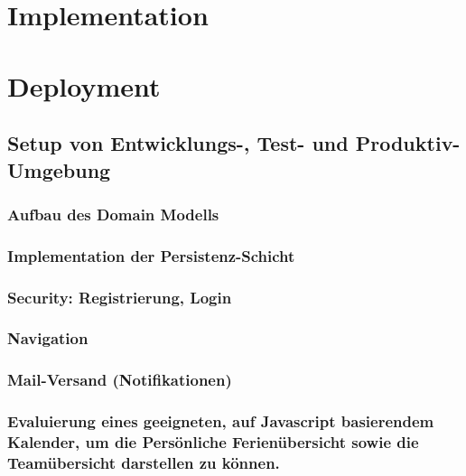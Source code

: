\chapter{Implementation}\label{implementation}\label{implementation}

\chapter{Deployment}
\section{Setup von Entwicklungs-, Test- und Produktiv-Umgebung}
\subsection{Aufbau des Domain Modells}


\subsection{Implementation der Persistenz-Schicht}
\subsection{Security: Registrierung, Login}
\subsection{Navigation}
\subsection{Mail-Versand (Notifikationen)}
\subsection{Evaluierung eines geeigneten, auf Javascript basierendem Kalender, um die Persönliche Ferien\"ubersicht sowie die Team\"ubersicht darstellen zu können.}




